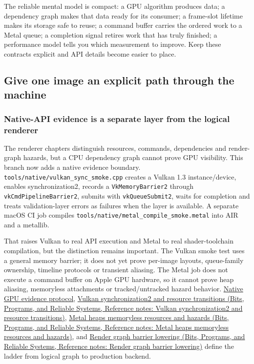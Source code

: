 The reliable mental model is compact: a GPU algorithm produces data; a dependency graph makes that data ready for its consumer; a frame-slot lifetime makes its storage safe to reuse; a command buffer carries the ordered work to a Metal queue; a completion signal retires work that has truly finished; a performance model tells you which measurement to improve. Keep these contracts explicit and API details become easier to place.

\subsection{Give one image an explicit path through the machine}\label{05-engine-i-ch019-give-one-image-an-explicit-path-through-the-machine}

\subsubsection{Native-API evidence is a separate layer from the logical renderer}\label{05-engine-i-ch019-native-api-evidence-is-a-separate-layer-from-the-logical-renderer}

The renderer chapters distinguish resources, commands, dependencies and render-graph hazards, but a CPU dependency graph cannot prove GPU visibility. This branch now adds a native evidence boundary. \texttt{tools/native/vulkan\_sync\_smoke.cpp} creates a Vulkan 1.3 instance/device, enables synchronization2, records a \texttt{VkMemoryBarrier2} through \texttt{vkCmdPipelineBarrier2}, submits with \texttt{vkQueueSubmit2}, waits for completion and treats validation-layer errors as failures when the layer is available. A separate macOS CI job compiles \texttt{tools/native/metal\_compile\_smoke.metal} into AIR and a metallib.

That raises Vulkan to real API execution and Metal to real shader-toolchain compilation, but the distinction remains important. The Vulkan smoke test uses a general memory barrier; it does not yet prove per-image layouts, queue-family ownership, timeline protocols or transient aliasing. The Metal job does not execute a command buffer on Apple GPU hardware, so it cannot prove heap aliasing, memoryless attachments or tracked/untracked hazard behavior. \hyperref[appendix-1680333ac796]{Native GPU evidence protocol}, \href{../01-Bits-Programs-and-Reliable-Systems/main.pdf\#nameddest=appendix-f15ce0d9c170}{Vulkan synchronization2 and resource transitions (Bits, Programs, and Reliable Systems, Reference notes: Vulkan synchronization2 and resource transitions)}, \href{../01-Bits-Programs-and-Reliable-Systems/main.pdf\#nameddest=appendix-563b2cb23fc3}{Metal heaps memoryless resources and hazards (Bits, Programs, and Reliable Systems, Reference notes: Metal heaps memoryless resources and hazards)}, and \href{../01-Bits-Programs-and-Reliable-Systems/main.pdf\#nameddest=appendix-0fc95374cb7e}{Render graph barrier lowering (Bits, Programs, and Reliable Systems, Reference notes: Render graph barrier lowering)} define the ladder from logical graph to production backend.

